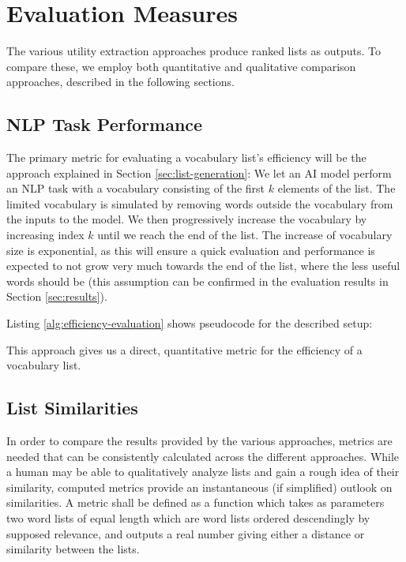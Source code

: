 \section{Evaluation Measures}

The various utility extraction approaches produce ranked lists as outputs.
To compare these, we employ both quantitative and qualitative comparison approaches, described in the following sections.

\subsection{NLP Task Performance}
The primary metric for evaluating a vocabulary list's efficiency will be the approach explained in Section \ref{sec:list-generation}: 
We let an AI model perform an NLP task with a vocabulary consisting of the first $k$ elements of the list.
The limited vocabulary is simulated by removing words outside the vocabulary from the inputs to the model.
We then progressively increase the vocabulary by increasing index $k$ until we reach the end of the list.
The increase of vocabulary size is exponential, as this will ensure a quick evaluation and performance is expected to not grow very much towards the end of the list, where the less useful words should be (this assumption can be confirmed in the evaluation results in Section \ref{sec:results}).

Listing \ref{alg:efficiency-evaluation} shows pseudocode for the described setup:



This approach gives us a direct, quantitative metric for the efficiency of a vocabulary list.

\subsection{List Similarities}
In order to compare the results provided by the various approaches, metrics are needed that can be consistently calculated across the different approaches.
While a human may be able to qualitatively analyze lists and gain a rough idea of their similarity, computed metrics provide an instantaneous (if simplified) outlook on similarities.
A metric shall be defined as a function which takes as parameters two word lists of equal length which are word lists ordered descendingly by supposed relevance, and outputs a real number giving either a distance or similarity between the lists.

